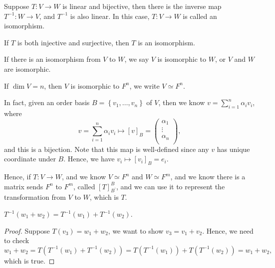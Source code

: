 \begin{theorem}[isomorphism]
    Suppose \(T: V \to  W\) is linear and bijective, then there is the inverse map \(T^{-1}: W \to  V\), and \(T^{-1} \) is also linear. In this case, \(T: V \to  W\) is called an isomorphism.    
\end{theorem}

\begin{definition}
    If \(T\) is both injective and surjective, then \(T\) is an isomorphism.  
\end{definition}

\begin{remark}
    If there is an isomorphism from \(V\) to \(W\), we say \(V\) is isomorphic to \(W\), or \(V\) and \(W\) are isomorphic.      
\end{remark}

\begin{eg}[Coordinates]
    If \(\dim V = n\), then \(V\) is isomorphic to \(F^n\), we write \(V \simeq F^n\).   
\end{eg}
\begin{explanation}
    In fact, given an order basis \(B = \left\{ v_1, \dots , v_n \right\} \) of \(V\), then we know \(v = \sum_{i=1}^n \alpha _i v_i \), where
    \[
        v = \sum_{i=1}^n \alpha _i v_i \mapsto [v]_B = \begin{pmatrix}
             \alpha _1 \\
             \vdots \\
              \alpha _n \\
        \end{pmatrix}, 
    \]   and this is a bijection. Note that this map is well-defined since any \(v\) has unique coordinate under \(B\).  Hence, we have \(v_i \mapsto [v_i]_B = e_i\).  
\end{explanation}

Hence, if \(T: V \to W\), and we know \(V \simeq F^n\) and \(W \simeq F^m\), and we know there is a matrix sends \(F^n\) to \(F^m\), called \([T]_{B^{\prime} }^B\), and we can use it to represent the transformation from \(V\) to \(W\), which is \(T\).

\begin{exercise}
    \(T^{-1}(w_1 + w_2) = T^{-1}(w_1) + T^{-1}(w_2)\). 
\end{exercise}
\begin{proof}
    Suppose \(T(v_3) = w_1 + w_2\), we want to show \(v_3 = v_1 + v_2\). Hence, we need to check 
    \[
        w_1 + w_2 = T \left( T^{-1}(w_1) + T^{-1}(w_2) \right) = T \left( T^{-1}(w_1) \right) + T \left( T^{-1}(w_2)  \right) = w_1 + w_2, 
    \] which is true.
\end{proof}